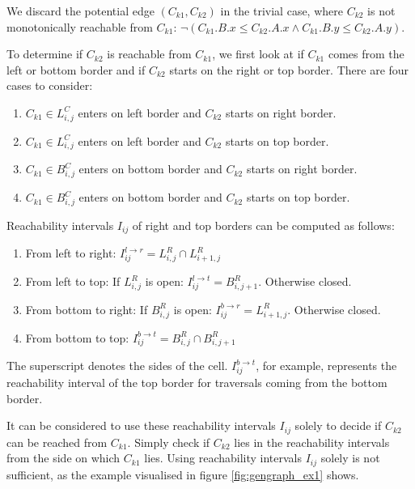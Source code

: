 We discard the potential edge $(C_{k1}, C_{k2})$ in the trivial case, where $C_{k2}$ is not monotonically reachable from $C_{k1}$: $\neg(C_{k1}.B.x \leq C_{k2}.A.x \wedge C_{k1}.B.y \leq C_{k2}.A.y)$.

To determine if $C_{k2}$ is reachable from $C_{k1}$, we first look at if $C_{k1}$ comes from the left or bottom border and if $C_{k2}$ starts on the right or top border. There are four cases to consider:

\begin{enumerate}
	\item $C_{k1} \in L_{i, j}^C$ enters on left border and $C_{k2}$ starts on right border.
	\item $C_{k1} \in L_{i, j}^C$ enters on left border and $C_{k2}$ starts on top border.
	\item $C_{k1} \in B_{i, j}^C$ enters on bottom border and $C_{k2}$ starts on right border.
	\item $C_{k1} \in B_{i, j}^C$ enters on bottom border and $C_{k2}$ starts on top border.
\end{enumerate}

Reachability intervals $I_{ij}$ of right and top borders can be computed as follows:

\begin{enumerate}
	\item From left to right: $I_{ij}^{l \rightarrow r} = L_{i, j}^R \cap L_{i+1, j}^R$
	\item From left to top: If $L_{i, j}^R$ is open: $I_{ij}^{l \rightarrow t} = B_{i, j+1}^R$. Otherwise closed.
	\item From bottom to right: If $B_{i, j}^R$ is open: $I_{ij}^{b \rightarrow r} = L_{i+1, j}^R$. Otherwise closed.
	\item From bottom to top: $I_{ij}^{b \rightarrow t} = B_{i, j}^R \cap B_{i, j+1}^R$
\end{enumerate}

The superscript denotes the sides of the cell. $I_{ij}^{b \rightarrow t}$, for example, represents the reachability interval of the top border for traversals coming from the bottom border.

It can be considered to use these reachability intervals $I_{ij}$ solely to decide if $C_{k2}$ can be reached from $C_{k1}$. Simply check if $C_{k2}$ lies in the reachability intervals from the side on which $C_{k1}$ lies. Using reachability intervals $I_{ij}$ solely is not sufficient, as the example visualised in figure \ref{fig:gengraph_ex1} shows.

